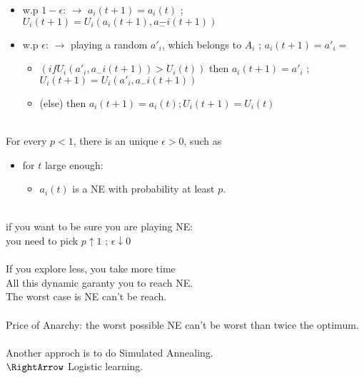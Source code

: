 \begin{itemize}
    \item w.p $1-\epsilon$: $\rightarrow$ $a_i(t + 1) = a_i(t)$ ; $U_i(t + 1) = U_i(a_i(t + 1), \underset{-}{a{-i}}(t+1))$
    \item w.p $\epsilon$: $\rightarrow$ playing a random $a'_i$, which belongs to $A_i$ ; $a_i(t + 1) = a'_i =$
    \begin{itemize}
        \item $(if U_i(a'_i, a_-i(t + 1)) > U_i(t))$ then $a_i(t + 1) = a'_i$   ; $U_i(t + 1) = U_i(a'_i, a_-i(t + 1))$\\
		\item (else)                               then $a_i(t + 1) = a_i(t) ; U_i(t + 1) = U_i(t)$
    \end{itemize}
\end{itemize}\\
For every $p < 1$, there is an unique $\epsilon > 0$, such as
\begin{itemize}
	\item for $t$ large enough:
    \begin{itemize}
		\item $a_i(t)$ is a NE with probability at least $p$.
    \end{itemize}
\end{itemize}
\\
if you want to be sure you are playing NE:\\
you need to pick $p \uparrow 1$ ; $\epsilon \downarrow 0$\\
\\
If you explore less, you take more time\\
All this dynamic garanty you to reach NE.\\
The worst case is NE can't be reach.\\
\\
Price of Anarchy: the worst possible NE can't be worst than twice the optimum.\\
\\
Another approch is to do Simulated Annealing.\\
$\RightArrow$ Logistic learning.\\
